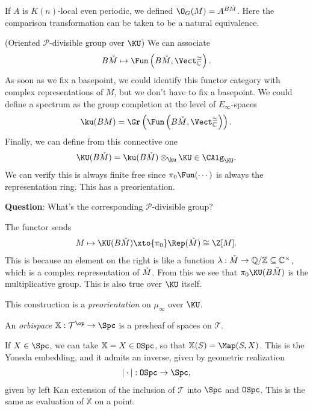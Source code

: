 \begin{example} If $A$ is $K(n)$-local even periodic, we defined $\O_G(M) = A^{B\v{M}}$. Here the comparison transformation can be taken to be a natural equivalence.
\end{example}

\begin{example} (Oriented $\mathcal{P}$-divisible group over $\KU$) We can associate
\begin{align*}
    B\v{M} \mapsto \Fun \left( B\v{M}, \Vect_\mathbb{C}^\simeq \right).
\end{align*}
As soon as we fix a basepoint, we could identify this functor category with complex representations of $M$, but we don't have to fix a basepoint. We could define a spectrum as the group completion at the level of $E_\infty$-spaces
\begin{align*}
    \ku(BM) = \Gr \left( \Fun \left(B\v{M}, \Vect_\mathbb{C}^\simeq \right)\right).
\end{align*}
Finally, we can define from this connective one
\begin{align*}
    \KU(B\v{M}) = \ku(B\v{M}) \otimes_\ku \KU \in \CAlg_{\KU}.
\end{align*}
We can verify this is always finite free since $\pi_0 \Fun(\cdots )$ is always the representation ring. This has a preorientation.
\end{example}

\textbf{Question}: What's the corresponding $\mathcal{P}$-divisible group?

The functor sends
\begin{align*}
    M \mapsto \KU(B\v{M}) \xto{\pi_0} \Rep( \v{M}) \cong \Z [M].
\end{align*}
This is because an element on the right is like a function $\lambda : \check{M} \to \mathbb{Q}/\mathbb{Z} \subseteq \mathbb{C}^\times$, which is a complex representation of $\check{M}$. From this we see that $\pi_0 \KU(B\v{M})$ is the multiplicative group. This is also true over $\KU$ itself.

This construction is a \textit{preorientation} on $\mu_\infty$ over $\KU$.


\begin{definition} An \textit{orbispace} $\mathbb{X}: \mathcal{T}^\op \to \Spc$ is a presheaf of spaces on $\mathcal{T}$.
\end{definition}

\begin{example} If $X \in \Spc$, we can take $\mathbb{X} = X \in \texttt{OSpc}$, so that $\mathbb{X}(S) = \Map(S,X)$. This is the Yoneda embedding, and it admits an inverse, given by geometric realization
\begin{align*}
    |\cdot| : \OSpc \to \Spc,
\end{align*}
given by left Kan extension of the inclusion of $\mathcal{T}$ into $\Spc$ and $\texttt{OSpc}$. This is the same as evaluation of $\mathbb{X}$ on a point.
\end{example}

